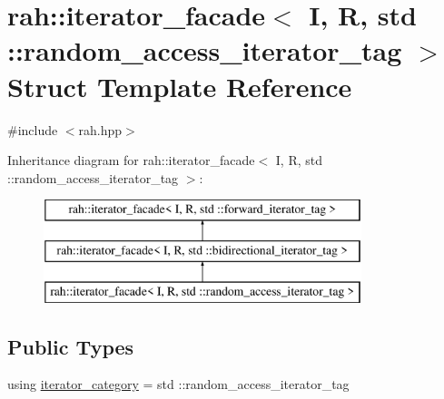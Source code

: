\hypertarget{structrah_1_1iterator__facade_3_01_i_00_01_r_00_01std_01_1_1random__access__iterator__tag_01_4}{}\section{rah\+::iterator\+\_\+facade$<$ I, R, std \+::random\+\_\+access\+\_\+iterator\+\_\+tag $>$ Struct Template Reference}
\label{structrah_1_1iterator__facade_3_01_i_00_01_r_00_01std_01_1_1random__access__iterator__tag_01_4}


{\ttfamily \#include $<$rah.\+hpp$>$}

Inheritance diagram for rah\+::iterator\+\_\+facade$<$ I, R, std \+::random\+\_\+access\+\_\+iterator\+\_\+tag $>$\+:\begin{figure}[H]
\begin{center}
\leavevmode
\includegraphics[height=3.000000cm]{structrah_1_1iterator__facade_3_01_i_00_01_r_00_01std_01_1_1random__access__iterator__tag_01_4}
\end{center}
\end{figure}
\subsection*{Public Types}
\begin{DoxyCompactItemize}
\item 
using \mbox{\hyperlink{structrah_1_1iterator__facade_3_01_i_00_01_r_00_01std_01_1_1random__access__iterator__tag_01_4_a7f2ab6cdf1c5182648b0210f431e3930}{iterator\+\_\+category}} = std \+::random\+\_\+access\+\_\+iterator\+\_\+tag
\end{DoxyCompactItemize}
